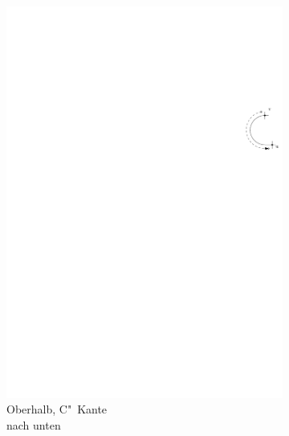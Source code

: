 \documentclass[a4paper]{scrreprt}
\theoremstyle{definition}
\begin{document}
\begin{figure}[h]
\begin{subfigure}[b]{0.2\textwidth}
                \includegraphics[width=\textwidth]{schnitt_finden_top_downwardsC}
                \caption{Oberhalb, C"~Kante \\ nach unten}
                \label{fig:cutfinding_top_downwardsC}
        \end{subfigure}
        \quad
        \begin{subfigure}[b]{0.2\textwidth}

\end{subfigure}
\end{figure}
\end{document}
